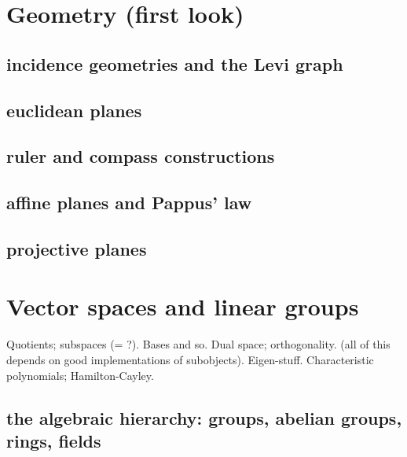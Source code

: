 
\usepackage[notref,notcite]{showkeys}
\renewcommand*{\showkeyslabelformat}[1]{%
  {\rotatebox[origin=cr]{60}{\normalfont\tiny\ttfamily#1}}}
%



\frontmatter
\thetitlepage

\renewcommand*{\contentsname}{Short contents}
\setcounter{tocdepth}{0} %
\tableofcontents
\clearpage
\renewcommand*{\contentsname}{Contents}
\setcounter{tocdepth}{1} %
\tableofcontents

%

\mainmatter











\chapter{Geometry (first look)}
\section{incidence geometries and the Levi graph}
\section{euclidean planes}
\section{ruler and compass constructions}
\section{affine planes and Pappus' law}
\section{projective planes}
\chapter{Vector spaces and linear groups}
Quotients; subspaces (= ?). Bases and so. Dual space; orthogonality. (all of this depends on good implementations of subobjects). Eigen-stuff. Characteristic polynomials; Hamilton-Cayley.
\section{the algebraic hierarchy: groups, abelian groups, rings, fields}
